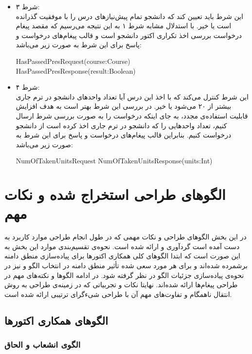 \begin{itemize}
\item شرط ۳:\\
 این شرط باید تعیین کند که دانشجو تمام پیش‌نیازهای درس را با موفقیت گذرانده است یا خیر. با استدلال مشابه شرط ۱ به این نتیجه می‌رسیم که مقصد پیغام درخواست بررسی اخذ تکراری اکتور دانشجو است و قالب پیغام‌های درخواست و پاسخ برای این شرط به صورت زیر می‌باشد:
 \begin{latin}
 HasPassedPresRequest(course:Course)
 HasPassedPresResponse(result:Boolean)
 \end{latin}
 
\item شرط ۴:\\
 این شرط کنترل می‌کند که با اخذ این درس آیا تعداد واحدهای دانشجو در ترم جاری بیشتر از ۲۰ می‌شود یا خیر. در بررسی این شرط بهتر است به هدف افزایش قابلیت استفاده‌ی مجدد، به جای اینکه درخواست را به صورت بررسی شرط ارسال کنیم، تعداد واحد‌هایی را که دانشجو در ترم جاری اخذ کرده است از دانشجو درخواست کنیم.
بنابراین قالب پیغام‌های درخواست و پاسخ برای این شرط به صورت زیر می‌باشد:
 \begin{latin}
 NumOfTakenUnitsRequest
 NumOfTakenUnitsResponse(units:Int)
 \end{latin}

\end{itemize}
\section{الگوهای طراحی استخراج شده و نکات مهم}
در این بخش الگوهای طراحی و نکات مهمی‌ که در طول انجام طراحی موارد کاربرد به دست آمده است گردآوری و ارائه شده است. نحوه‌ی تقسیم‌بندی موارد این بخش به این صورت است که ابتدا الگوهای  کلی همکاری اکتورها برای پیاده‌سازی منطق دامنه برشمرده شده‌اند و برای هر مورد سعی شده تأثیر منطق دامنه در انتخاب الگو و نیز در نحوه‌ی پیاده‌سازی جزئیات الگو در نظر گرفته شود. در ادامه الگوها و نکته‌های مهم در طراحی پیغام‌ها ارائه شده‌اند. نهایتا نکات و تجربیاتی که در زمینه‌ی طراحی به روش انتقال ناهمگام و تفاوت‌های مهم آن با طراحی شیءگرای ترتیبی ارائه شده است.
\subsection{الگوهای همکاری اکتورها}
\subsubsection{الگوی انشعاب و الحاق}

